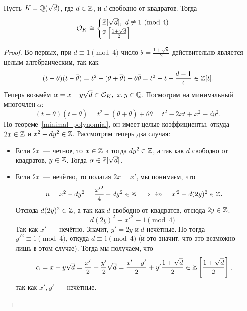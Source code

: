 	\begin{theorem} 
		Пусть $K = \mathbb{Q}(\sqrt{d})$, где $d \in \mathbb{Z}$, и $d$ свободно от квадратов. Тогда  
		\[
		  		\mathcal{O}_{K} \cong \begin{cases} \mathbb{Z}[\sqrt{d}], \ d \not\equiv 1 \pmod{4} \\ \mathbb{Z}\left[ \frac{1 + \sqrt{d}}{2} \right] \end{cases}.
		  	\]  	
	\end{theorem}
	\begin{proof}
		Во-первых, при $d \equiv 1 \pmod{4}$ число $\theta = \frac{1 + \sqrt{d}}{2} $ действительно является целым алгебраическим, так как 
		\[
			(t - \theta)(t - \overline{\theta}) = t^2 - (\theta + \overline{\theta}) + \theta \overline{\theta} = t^2 - t - \frac{d - 1}{4} \in \mathbb{Z}[t]. 
		\]
		Теперь возьмём $\alpha = x + y\sqrt{d} \in \mathcal{O}_{K}, \ x, y \in \mathbb{Q}$. Посмотрим на минимальный многочлен $\alpha$: 
		\[
			(t - \theta)(t - \overline{\theta}) = t^2 - (\theta + \overline{\theta}) + \theta \overline{\theta} = t^2 - 2xt + x^2 - dy^2.
		\]
		По теореме~\ref{minimal_polynomial}, он имеет целые коэффициенты, откуда $2x \in \mathbb{Z}$ и $x^2 - dy^2 \in \mathbb{Z}$. Рассмотрим теперь два случая: 

		\begin{itemize}
			\item Если $2x$~--- четное, то $x \in \mathbb{Z}$ и тогда $dy^2 \in \mathbb{Z}$, а так как $d$ свободно от квадратов, $y \in \mathbb{Z}$. Тогда $\alpha \in \mathbb{Z}[\sqrt{d}]$. 

			\item Если $2x$~--- нечётно, то полагая $2x = x'$, мы понимаем, что 
			\[
				n = x^2 - dy^2 = \frac{x'^2}{4} - dy^2 \in \mathbb{Z} \implies 4n = x'^2 - d(2y)^2 \in \mathbb{Z}.	
			\]
			Отсюда $d(2y)^2 \in \mathbb{Z}$, а так как $d$ свободно от квадратов, отсюда $2y \in \mathbb{Z}$. 
			\[
				d(2y)^2 \equiv x'^2 \equiv 1 \pmod{4}, 
			\]
			Так как $x'$~--- нечётно. Значит, $y' = 2y$ и $d$ нечётные. Но тогда $y'^2 \equiv 1 \pmod{4}$, откуда $d \equiv 1 \pmod{4}$ (и это значит, что это возможно лишь в этом случае). Тогда мы получаем, что 
			\[
			 	\alpha = x + y\sqrt{d} = \frac{x'}{2} + \frac{y'}{2}\sqrt{d} = \frac{x' - y'}{2} + y' \frac{1 + \sqrt{d}}{2} \in \mathbb{Z}\left[ \frac{1 + \sqrt{d}}{2} \right],
			 \] 
			 так как $x', y'$~--- нечётные. 
		\end{itemize}
	\end{proof}
